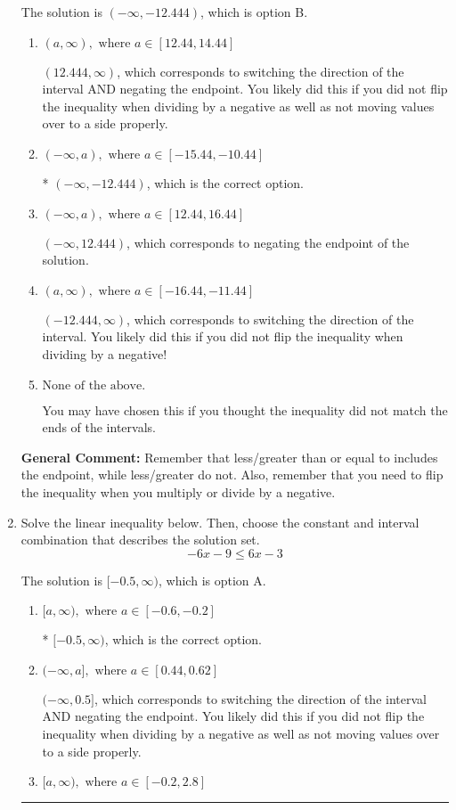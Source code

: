 \documentclass{extbook}[14pt]
\newcommand{\litem}[1]{\item #1

\rule{\textwidth}{0.4pt}}
\begin{document}
\begin{enumerate}
{The solution is \( (-\infty, -12.444) \), which is option B.\begin{enumerate}[label=\Alph*.]
\item \( (a, \infty), \text{ where } a \in [12.44, 14.44] \)

 $(12.444, \infty)$, which corresponds to switching the direction of the interval AND negating the endpoint. You likely did this if you did not flip the inequality when dividing by a negative as well as not moving values over to a side properly.
\item \( (-\infty, a), \text{ where } a \in [-15.44, -10.44] \)

* $(-\infty, -12.444)$, which is the correct option.
\item \( (-\infty, a), \text{ where } a \in [12.44, 16.44] \)

 $(-\infty, 12.444)$, which corresponds to negating the endpoint of the solution.
\item \( (a, \infty), \text{ where } a \in [-16.44, -11.44] \)

 $(-12.444, \infty)$, which corresponds to switching the direction of the interval. You likely did this if you did not flip the inequality when dividing by a negative!
\item \( \text{None of the above}. \)

You may have chosen this if you thought the inequality did not match the ends of the intervals.
\end{enumerate}

\textbf{General Comment:} Remember that less/greater than or equal to includes the endpoint, while less/greater do not. Also, remember that you need to flip the inequality when you multiply or divide by a negative.
}
\litem{
Solve the linear inequality below. Then, choose the constant and interval combination that describes the solution set.
\[ -6x -9 \leq 6x -3 \]

The solution is \( [-0.5, \infty) \), which is option A.\begin{enumerate}[label=\Alph*.]
\item \( [a, \infty), \text{ where } a \in [-0.6, -0.2] \)

* $[-0.5, \infty)$, which is the correct option.
\item \( (-\infty, a], \text{ where } a \in [0.44, 0.62] \)

 $(-\infty, 0.5]$, which corresponds to switching the direction of the interval AND negating the endpoint. You likely did this if you did not flip the inequality when dividing by a negative as well as not moving values over to a side properly.
\item \( [a, \infty), \text{ where } a \in [-0.2, 2.8] \)


\end{enumerate}}
\end{enumerate}
\end{document}
